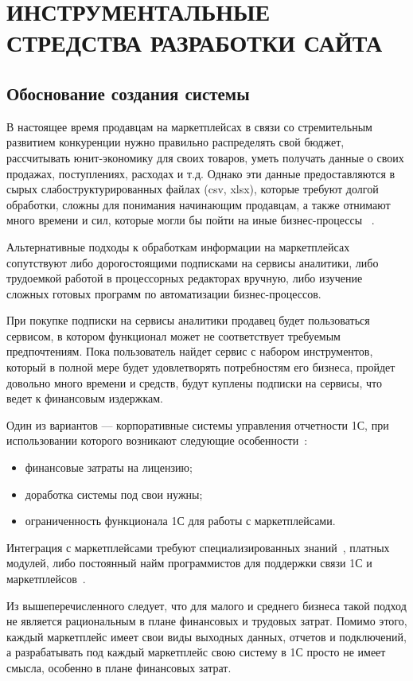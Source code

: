 \chapter{ИНСТРУМЕНТАЛЬНЫЕ СТРЕДСТВА РАЗРАБОТКИ САЙТА}

\section{Обоснование создания системы}
В настоящее время продавцам на маркетплейсах в связи со стремительным развитием конкуренции нужно правильно распределять свой бюджет, рассчитывать юнит-экономику для своих товаров, уметь получать данные о своих продажах, поступлениях, расходах и т.д. Однако эти данные предоставляются в сырых слабоструктурированных файлах (csv, xlsx), которые требуют долгой обработки, сложны для понимания начинающим продавцам, а также отнимают много времени и сил, которые могли бы пойти на иные бизнес-процессы ~\cite{problemSellers}.

Альтернативные подходы к обработкам информации на маркетплейсах сопутствуют либо дорогостоящими подписками на сервисы аналитики, либо трудоемкой работой в процессорных редакторах вручную, либо изучение сложных готовых программ по автоматизации бизнес-процессов.

При покупке подписки на сервисы аналитики продавец будет пользоваться сервисом, в котором функционал может не соответствует требуемым предпочтениям. Пока пользователь найдет сервис с набором инструментов, который в полной мере будет удовлетворять потребностям его бизнеса, пройдет довольно много времени и средств, будут куплены подписки на сервисы, что ведет к финансовым издержкам.

Один из вариантов — корпоративные системы управления отчетности 1С, при использовании которого возникают следующие особенности~\cite{integracia1C}:
\begin{itemize}
 \item финансовые затраты на лицензию;
 \item доработка системы под свои нужны;
 \item ограниченность функционала 1С для работы с маркетплейсами.
\end{itemize}

Интеграция с маркетплейсами требуют специализированных знаний~\cite{integracia1C}, платных модулей, либо постоянный найм программистов для поддержки связи 1С и маркетплейсов~\cite{integracia1C}. 

Из вышеперечисленного следует, что для малого и среднего бизнеса такой подход не является рациональным в плане финансовых и трудовых затрат. Помимо этого, каждый маркетплейс имеет свои виды выходных данных, отчетов и подключений, а разрабатывать под каждый маркетплейс свою систему в 1С просто не имеет смысла, особенно в плане финансовых затрат.

